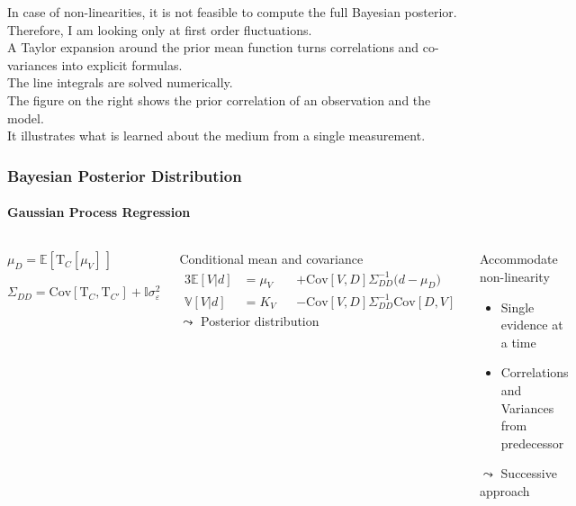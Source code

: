 \documentclass[aspectratio=169, t, 10pt,
    ]{beamer}
\newcommand\Mean[1]{\mathbb{E}\!\left[#1\right]}
\newcommand\Var[1]{\mathbb{V}\!\left[#1\right]}
\newcommand\Cov[2]{\mathrm{Cov}\!\left[#1,#2\right]}
\newcommand{\Identity}{\mathbb{I}}
\begin{document}
In case of non-linearities, it is not feasible to compute the full Bayesian posterior.
\\
Therefore, I am looking only at first order fluctuations.
\\
A Taylor expansion around the prior mean function turns correlations and co-variances into explicit formulas.
\\
The line integrals are solved numerically.
\\[2mm]

The figure on the right shows the prior correlation of an observation and the model.
\\
It illustrates what is learned about the medium from a single measurement.



\begin{frame}
    \frametitle{Bayesian Posterior Distribution}
    \framesubtitle{Gaussian Process Regression}

\begin{columns}

    \vspace{-1mm}
    \begin{description}[labelwidth=25mm]
        \item [Prior travel times] $\mu_D = \Mean{\mathrm T_C[\mu_V]\,}$
        \item [Covariance matrix]  $\Sigma_{DD} = \Cov{\mathrm T_C}{\mathrm T_{C'}} + \Identity \sigma_\varepsilon^2$
    \end{description}
    \vspace{-1mm}

    \begin{exampleblock}{Conditional mean and covariance}
        \setlength\abovedisplayskip{0pt}
        \begin{alignat}{3}
            \Mean{V|d} &= \mu_V &&+ \Cov VD \Sigma_{DD}^{-1} \big( d - \mu_{D} \big)
            \\
            \Var{V|d}  &= K_V   &&- \Cov VD \Sigma_{DD}^{-1} \Cov DV
        \end{alignat}
        \hfill $\leadsto$ Posterior distribution ~
    \end{exampleblock}

    \begin{alertblock}{Accommodate non-linearity}
        \begin{itemize}
            \item Single evidence at a time
            \item Correlations and Variances from predecessor
        \end{itemize}
        \hfill  $\leadsto$ Successive approach ~
    \end{alertblock}


\end{columns}
\end{frame}
\end{document}
